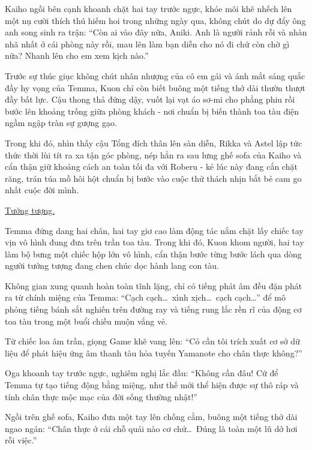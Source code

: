 \documentclass[../main.tex]{subfiles}
\begin{document}
Kaiho ngồi bên cạnh khoanh chặt hai tay trước ngực, khóe môi khẽ nhếch lên một nụ cười thích thú hiếm hoi trong những ngày qua, không chút do dự đẩy ông anh song sinh ra trận: ``Còn ai vào đây nữa, Aniki. Anh là người rảnh rỗi và nhàn nhã nhất ở cái phòng này rồi, mau lên làm bạn diễn cho nó đi chứ còn chờ gì nữa? Nhanh lên cho em xem kịch nào.''

Trước sự thúc giục không chút nhân nhượng của cô em gái và ánh mắt sáng quắc đầy hy vọng của Temma, Kuon chỉ còn biết buông một tiếng thở dài thườn thượt đầy bất lực. Cậu thong thả đứng dậy, vuốt lại vạt áo sơ-mi cho phẳng phiu rồi bước lên khoảng trống giữa phòng khách - nơi chuẩn bị biến thành toa tàu điện ngầm ngập tràn sự gượng gạo.

Trong khi đó, nhìn thấy cậu Tổng đích thân lên sàn diễn, Rikka và Astel lập tức thức thời lùi tít ra xa tận góc phòng, nép hẳn ra sau lưng ghế sofa của Kaiho và cẩn thận giữ khoảng cách an toàn tối đa với Roberu - kẻ lúc này đang cắn chặt răng, trán túa mồ hôi hột chuẩn bị bước vào cuộc thử thách nhịn bắt bẻ cam go nhất cuộc đời mình.

\begin{center}
  \uline{Tưởng tượng.}
\end{center}

Temma đứng dang hai chân, hai tay giơ cao làm động tác nắm chặt lấy chiếc tay vịn vô hình đung đưa trên trần toa tàu. Trong khi đó, Kuon khom người, hai tay làm bộ bưng một chiếc hộp lớn vô hình, cẩn thận bước từng bước lách qua dòng người tưởng tượng đang chen chúc dọc hành lang con tàu.


Không gian xung quanh hoàn toàn tĩnh lặng, chỉ có tiếng phát âm đều đặn phát ra từ chính miệng của Temma: ``Cạch cạch\dots\ xình xịch\dots\ cạch cạch\dots'' để mô phỏng tiếng bánh sắt nghiến trên đường ray và tiếng rung lắc rền rĩ của động cơ toa tàu trong một buổi chiều muộn vắng vẻ.

Từ chiếc loa âm trần, giọng Game khẽ vang lên: ``Có cần tôi trích xuất cơ sở dữ liệu để phát hiệu ứng âm thanh tàu hỏa tuyến Yamanote cho chân thực không?''

Oga khoanh tay trước ngực, nghiêm nghị lắc đầu: ``Không cần đâu! Cứ để Temma tự tạo tiếng động bằng miệng, như thế mới thể hiện được sự thô ráp và tính chân thực mộc mạc của đời sống thường nhật!''

Ngồi trên ghế sofa, Kaiho đưa một tay lên chống cằm, buông một tiếng thở dài ngao ngán: ``Chân thực ở cái chỗ quái nào cơ chứ\dots\ Đúng là toàn một lũ dở hơi rỗi việc.''
\end{document}

